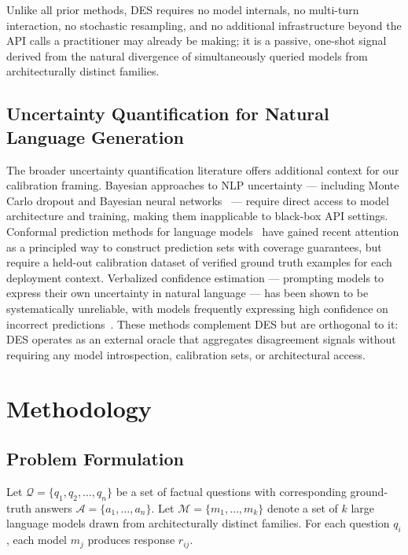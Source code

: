 \documentclass[journal]{IEEEtran}
\begin{document}
Unlike all prior methods, DES requires no model internals, no multi-turn
interaction, no stochastic resampling, and no additional infrastructure
beyond the API calls a practitioner may already be making;
it is a passive, one-shot signal derived from the natural divergence of
simultaneously queried models from architecturally distinct families.

\subsection{Uncertainty Quantification for Natural Language Generation}

The broader uncertainty quantification literature offers additional context
for our calibration framing.
Bayesian approaches to NLP uncertainty --- including Monte Carlo dropout and
Bayesian neural networks~\cite{gal2016dropout} --- require direct access to model architecture and
training, making them inapplicable to black-box API settings.
Conformal prediction methods for language models~\cite{angelopoulos2021gentle} have gained recent
attention as a principled way to construct prediction sets with coverage
guarantees, but require a held-out calibration dataset of verified ground
truth examples for each deployment context.
Verbalized confidence estimation --- prompting models to express their own
uncertainty in natural language --- has been shown to be systematically
unreliable, with models frequently expressing high confidence on incorrect
predictions~\cite{farquhar2024detecting}.
These methods complement DES but are orthogonal to it: DES operates as an
external oracle that aggregates disagreement signals without requiring any
model introspection, calibration sets, or architectural access.

\section{Methodology}
\label{sec:methodology}

\subsection{Problem Formulation}

Let $\mathcal{Q} = \{q_1, q_2, \ldots, q_n\}$ be a set of factual questions
with corresponding ground-truth answers $\mathcal{A} = \{a_1, \ldots, a_n\}$.
Let $\mathcal{M} = \{m_1, \ldots, m_k\}$ denote a set of $k$ large language
models drawn from architecturally distinct families.
For each question $q_i$, each model $m_j$ produces response $r_{ij}$.
\end{document}
